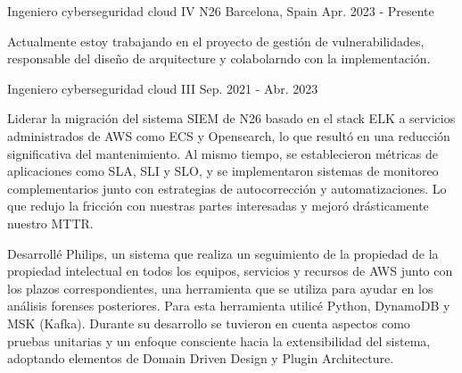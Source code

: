 
\begin{cventries}
	\cventry
	{Ingeniero cyberseguridad cloud IV} %
	{N26} %
	{Barcelona, Spain} %
	{Apr. 2023 - Presente} %
	{
		\begin{cvitems} %
			\item {Actualmente estoy trabajando en el proyecto de gestión de vulnerabilidades, responsable del diseño de arquitecture y colabolarndo con la implementación.}
		\end{cvitems}
	}

	\cventry
	{Ingeniero cyberseguridad cloud III} %
	{} %
	{} %
	{Sep. 2021 - Abr. 2023} %
	{
		\begin{cvitems} %
			\item {Liderar la migración del sistema SIEM de N26 basado en el stack ELK a servicios administrados de AWS como ECS y Opensearch, lo que resultó en una reducción significativa del mantenimiento. Al mismo tiempo, se establecieron métricas de aplicaciones como SLA, SLI y SLO, y se implementaron sistemas de monitoreo complementarios junto con estrategias de autocorrección y automatizaciones. Lo que redujo la fricción con nuestras partes interesadas y mejoró drásticamente nuestro MTTR.}
			\item {Desarrollé Philips, un sistema que realiza un seguimiento de la propiedad de la propiedad intelectual en todos los equipos, servicios y recursos de AWS junto con los plazos correspondientes, una herramienta que se utiliza para ayudar en los análisis forenses posteriores. Para esta herramienta utilicé Python, DynamoDB y MSK (Kafka). Durante su desarrollo se tuvieron en cuenta aspectos como pruebas unitarias y un enfoque consciente hacia la extensibilidad del sistema, adoptando elementos de Domain Driven Design y Plugin Architecture.}
		\end{cvitems}
	}


\end{cventries}
